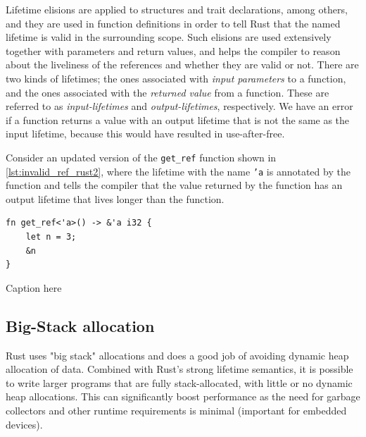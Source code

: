 Lifetime elisions are applied to structures and trait declarations, among others, and they are used in function definitions in order to tell Rust that the named lifetime is valid in the surrounding scope.
Such elisions are used extensively together with parameters and return values, and helps the compiler to reason about the liveliness of the references and whether they are valid or not.
There are two kinds of lifetimes; the ones associated with \emph{input parameters} to a function, and the ones associated with the \emph{returned value} from a function.
These are referred to as \emph{input-lifetimes} and \emph{output-lifetimes}, respectively.
We have an error if a function returns a value with an output lifetime that is not the same as the input lifetime, because this would have resulted in use-after-free.

Consider an updated version of the \texttt{get\_ref} function shown in \autoref{lst:invalid_ref_rust2}, where the lifetime with the name \texttt{'a} is annotated by the function and tells the compiler that the value returned by the function has an output lifetime that lives longer than the function.

\begin{listing}[tb]
\begin{verbatim}
fn get_ref<'a>() -> &'a i32 {
    let n = 3;
    &n
}
\end{verbatim}
\caption{Caption here}
\label{lst:invalid_ref_rust}
\end{listing}



\subsection{Big-Stack allocation}
\label{par:big_stack}

Rust uses "big stack" allocations and does a good job of avoiding dynamic heap allocation of data.
Combined with Rust's strong lifetime semantics, it is possible to write larger programs that are fully stack-allocated, with little or no dynamic heap allocations.
This can significantly boost performance as the need for garbage collectors and other runtime requirements is minimal (important for embedded devices).

